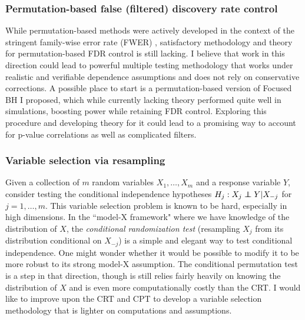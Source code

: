 \documentclass[11pt]{article}
\def\independenT#1#2{\mathrel{\rlap{$#1#2$}\mkern2mu{#1#2}}}
\newcommand\independent{\protect\mathpalette{\protect\independenT}{\perp}}
\begin{document}
\subsubsection*{Permutation-based false (filtered) discovery rate control}

While permutation-based methods were actively developed in the context of the stringent family-wise error rate (FWER) \cite{WY}, satisfactory methodology and theory for permutation-based FDR control is still lacking. I believe that work in this direction could lead to powerful multiple testing methodology that works under realistic and verifiable dependence assumptions and does not rely on conservative corrections. A possible place to start is a permutation-based version of Focused BH I proposed, which while currently lacking theory performed quite well in simulations, boosting power while retaining FDR control. Exploring this procedure and developing theory for it could lead to a promising way to account for p-value correlations as well as complicated filters.


\subsubsection*{Variable selection via resampling}

Given a collection of $m$ random variables $X_1, \dots, X_m$ and a response variable $Y$, consider testing the conditional independence hypotheses $H_j: X_j \independent Y | X_{-j}$ for $j = 1, \dots, m$. This variable selection problem is known to be hard, especially in high dimensions. In the ``model-X framework" where we have knowledge of the distribution of $X$, the \textit{conditional randomization test} \cite{modelX} (resampling $X_j$ from its distribution conditional on $X_{-j}$) is a simple and elegant way to test conditional independence. One might wonder whether it would be possible to modify it to be more robust to its strong model-X assumption. The conditional permutation test \cite{CPT} is a step in that direction, though is still relies fairly heavily on knowing the distribution of $X$ and is even more computationally costly than the CRT. I would like to improve upon the CRT and CPT to develop a variable selection methodology that is lighter on computations and assumptions. %
\end{document}
